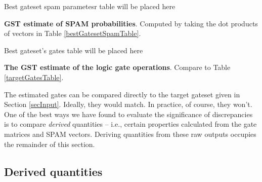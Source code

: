 \documentclass{article}[11pt]
\newcommand{\putfield}[2]{#2}
\begin{document}
\begin{table}[h]
\begin{center}
\putfield{bestGatesetSpamParametersTable}{Best gateset spam parametesr table will be placed here}
\caption{\textbf{GST estimate of SPAM probabilities}.  Computed by taking the dot products of vectors in Table \ref{bestGatesetSpamTable}.\label{bestGatesetSpamParametersTable}}
\end{center}
\end{table}

\begin{table}[h]
\begin{center}
\putfield{bestGatesetGatesTable}{Best gateset's gates table will be placed here}
\caption{\textbf{The GST estimate of the logic gate operations}.  Compare to Table \ref{targetGatesTable}.\label{bestGatesetGatesTable}}
\end{center}
\end{table}

The estimated gates can be compared directly to the target gateset given in Section \ref{secInput}.  Ideally, they would match.  In practice, of course, they won't.  One of the best ways we have found to evaluate the significance of discrepancies is to compare \emph{derived} quantities -- i.e., certain properties calculated from the gate matrices and SPAM vectors.  Deriving quantities from these raw outputs occupies the remainder of this section.

\subsection{Derived quantities\label{derivedQtySection}}
\end{document}
